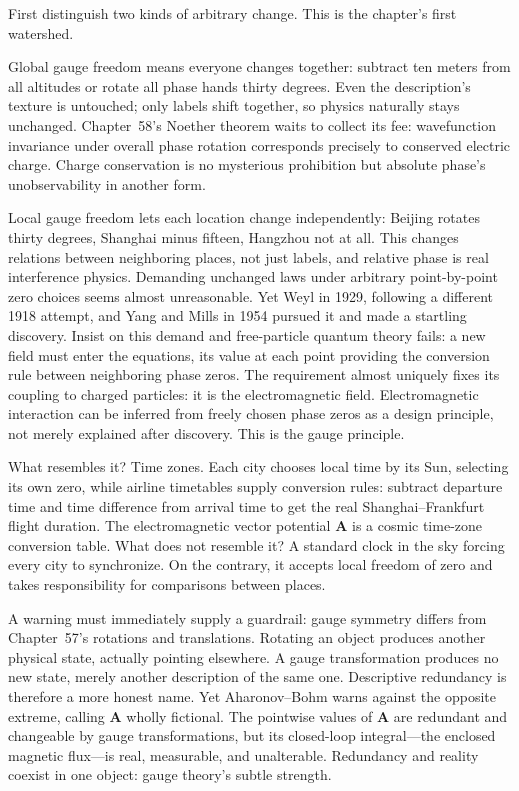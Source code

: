 \begin{mainline}
First distinguish two kinds of arbitrary change. This is the chapter's first watershed.

Global gauge freedom means everyone changes together: subtract ten meters from all altitudes or rotate all phase hands thirty degrees. Even the description's texture is untouched; only labels shift together, so physics naturally stays unchanged. Chapter~58's Noether theorem waits to collect its fee: wavefunction invariance under overall phase rotation corresponds precisely to conserved electric charge. Charge conservation is no mysterious prohibition but absolute phase's unobservability in another form.

Local gauge freedom lets each location change independently: Beijing rotates thirty degrees, Shanghai minus fifteen, Hangzhou not at all. This changes relations between neighboring places, not just labels, and relative phase is real interference physics. Demanding unchanged laws under arbitrary point-by-point zero choices seems almost unreasonable. Yet Weyl in 1929, following a different 1918 attempt, and Yang and Mills in 1954 pursued it and made a startling discovery. Insist on this demand and free-particle quantum theory fails: a new field must enter the equations, its value at each point providing the conversion rule between neighboring phase zeros. The requirement almost uniquely fixes its coupling to charged particles: it is the electromagnetic field. Electromagnetic interaction can be inferred from freely chosen phase zeros as a design principle, not merely explained after discovery. This is the gauge principle.

What resembles it? Time zones. Each city chooses local time by its Sun, selecting its own zero, while airline timetables supply conversion rules: subtract departure time and time difference from arrival time to get the real Shanghai--Frankfurt flight duration. The electromagnetic vector potential \(\mathbf A\) is a cosmic time-zone conversion table. What does not resemble it? A standard clock in the sky forcing every city to synchronize. On the contrary, it accepts local freedom of zero and takes responsibility for comparisons between places.

A warning must immediately supply a guardrail: gauge symmetry differs from Chapter~57's rotations and translations. Rotating an object produces another physical state, actually pointing elsewhere. A gauge transformation produces no new state, merely another description of the same one. Descriptive redundancy is therefore a more honest name. Yet Aharonov--Bohm warns against the opposite extreme, calling \(\mathbf A\) wholly fictional. The pointwise values of \(\mathbf A\) are redundant and changeable by gauge transformations, but its closed-loop integral---the enclosed magnetic flux---is real, measurable, and unalterable. Redundancy and reality coexist in one object: gauge theory's subtle strength.


\end{mainline}
